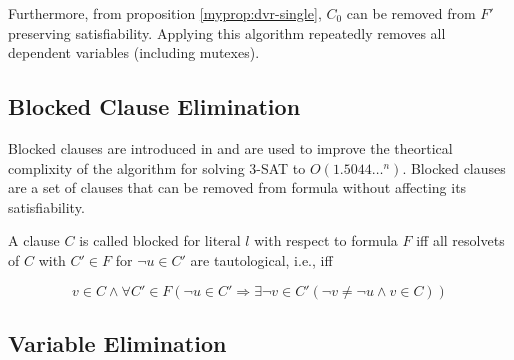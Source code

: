 Furthermore, from proposition \ref{myprop:dvr-single}, $C_0$ can be
removed from $F'$ preserving satisfiability. Applying this algorithm
repeatedly removes all dependent variables (including mutexes).


\subsection{Blocked Clause Elimination}
\label{ssec:bce}

Blocked clauses are introduced in
\cite{Kullmann:1999:NMD:312269.312271} and are used to improve
the theortical complixity of the algorithm for solving 3-SAT to
$O(1.5044\ldots^n)$. Blocked clauses are a set of clauses that can
be removed from formula without affecting its satisfiability.


\begin{mydef}A clause $C$ is called blocked for literal $l$ with
respect to formula $F$ iff all resolvets of $C$ with $C' \in F$
for $\neg u \in C'$ are tautological, i.e., iff

\[
  v \in C \land \forall C' \in F (\neg u \in C' \Rightarrow \exists \neg v \in C'
  (\neg v \not = \neg u \land v \in C))
\]
\end{mydef}

\subsection{Variable Elimination}
\label{ssec:ve}


